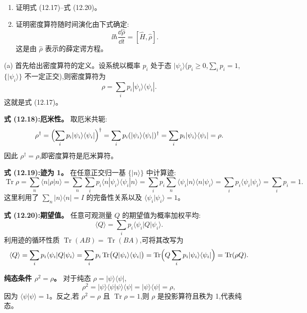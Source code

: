 \begin{question}
\begin{enumerate}
\item 证明式 (12.17)--式 (12.20)。
\item 证明密度算符随时间演化由下式确定:
\[
\ii\hbar\frac{\dd\hat\rho}{\dd t}=[\hat H,\hat\rho].
\]
这是由 $\hat\rho$ 表示的薛定谔方程。
\end{enumerate}

\par\smallskip
{}

\end{question}
\begin{solution}
(a) 首先给出密度算符的定义。设系统以概率 $p_i$ 处于态 $|\psi_i\rangle$($p_i\ge0$,$\sum_i p_i=1$,$\{|\psi_i\rangle\}$ 不一定正交),则密度算符为
\[
\rho = \sum_i p_i |\psi_i\rangle\langle\psi_i|.
\]
这就是式 (12.17)。

\textbf{式 (12.18):厄米性。}
取厄米共轭:
\[
\rho^\dagger = \Bigl(\sum_i p_i |\psi_i\rangle\langle\psi_i|\Bigr)^\dagger
= \sum_i p_i (|\psi_i\rangle\langle\psi_i|)^\dagger
= \sum_i p_i |\psi_i\rangle\langle\psi_i| = \rho.
\]
因此 $\rho^\dagger = \rho$,即密度算符是厄米算符。

\textbf{式 (12.19):迹为 1。}
在任意正交归一基 $\{|n\rangle\}$ 中计算迹:
\[
\operatorname{Tr}\rho = \sum_n \langle n|\rho|n\rangle
= \sum_n \sum_i p_i \langle n|\psi_i\rangle\langle\psi_i|n\rangle
= \sum_i p_i \sum_n \langle\psi_i|n\rangle\langle n|\psi_i\rangle
= \sum_i p_i \langle\psi_i|\psi_i\rangle = \sum_i p_i = 1.
\]
这里利用了 $\sum_n |n\rangle\langle n| = I$ 的完备性关系以及 $\langle\psi_i|\psi_i\rangle=1$。

\textbf{式 (12.20):期望值。}
任意可观测量 $Q$ 的期望值为概率加权平均:
\[
\langle Q\rangle = \sum_i p_i \langle\psi_i|Q|\psi_i\rangle.
\]
利用迹的循环性质 $\operatorname{Tr}(AB)=\operatorname{Tr}(BA)$,可将其改写为
\[
\langle Q\rangle = \sum_i p_i \langle\psi_i|Q|\psi_i\rangle
= \sum_i p_i \operatorname{Tr}\bigl(Q|\psi_i\rangle\langle\psi_i|\bigr)
= \operatorname{Tr}\Bigl(Q\sum_i p_i|\psi_i\rangle\langle\psi_i|\Bigr)
= \operatorname{Tr}(\rho Q).
\]

\textbf{纯态条件 $\rho^2=\rho$。}
对于纯态 $\rho=|\psi\rangle\langle\psi|$,
\[
\rho^2 = |\psi\rangle\langle\psi|\psi\rangle\langle\psi| = |\psi\rangle\langle\psi| = \rho,
\]
因为 $\langle\psi|\psi\rangle=1$。反之,若 $\rho^2=\rho$ 且 $\operatorname{Tr}\rho=1$,则 $\rho$ 是投影算符且秩为 1,代表纯态。


\end{solution}
